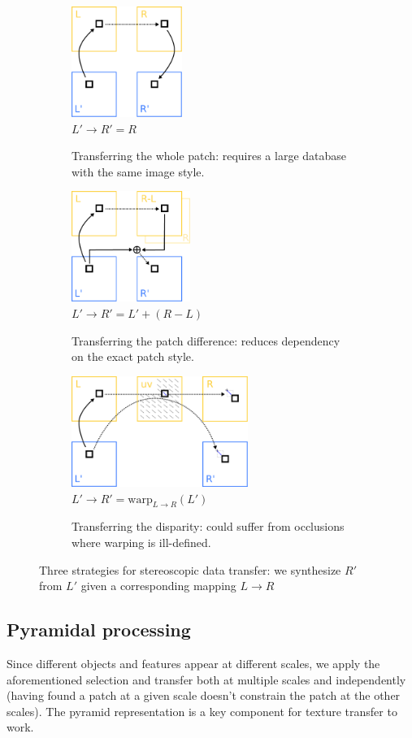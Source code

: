 \begin{figure}[ht!]
	\centering
	\begin{subfigure}[t]{0.29\textwidth}
	\centering
		\includegraphics[height=3.6cm]{figures/transfers-A}
		\\
		$L' \to R'=R$
		\caption{Transferring the whole patch: requires a large database with the same image style.}
	\end{subfigure}\hfill
	\begin{subfigure}[t]{0.29\textwidth}
	\centering
		\includegraphics[height=3.6cm]{figures/transfers-B}
		\\
		$L' \to R'=L'+(R-L)$
		\caption{Transferring the patch difference: reduces dependency on the exact patch style.}
	\end{subfigure}\hfill
	\begin{subfigure}[t]{0.4\textwidth}
	\centering
		\includegraphics[height=3.6cm]{figures/transfers-C}
		\\
		$L' \to R'=\textrm{warp}_{L\to R}(L')$
		\caption{Transferring the disparity: could suffer from occlusions where warping is ill-defined.}
	\end{subfigure}
	\caption{Three strategies for stereoscopic data transfer: we synthesize $R'$ from $L'$ given a corresponding mapping $L\to R$}
	\label{fig:transfers}
\end{figure}

\subsection{Pyramidal processing}
Since different objects and features appear at different scales, we apply the aforementioned selection and transfer both at multiple scales and independently (having found a patch at a given scale doesn't constrain the patch at the other scales).
The pyramid representation is a key component for texture transfer to work.

